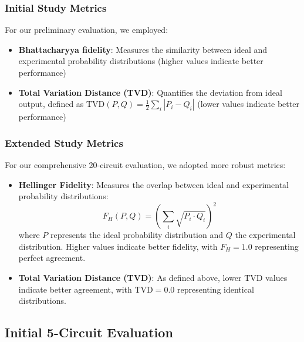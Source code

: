 \documentclass[conference]{IEEEtran}
\begin{document}
\subsubsection{Initial Study Metrics}
For our preliminary evaluation, we employed:
\begin{itemize}
    \item \textbf{Bhattacharyya fidelity}: Measures the similarity between ideal and experimental probability distributions (higher values indicate better performance)
    \item \textbf{Total Variation Distance (TVD)}: Quantifies the deviation from ideal output, defined as $\text{TVD}(P,Q) = \frac{1}{2} \sum_i |P_i - Q_i|$ (lower values indicate better performance)
\end{itemize}

\subsubsection{Extended Study Metrics}
For our comprehensive 20-circuit evaluation, we adopted more robust metrics:
\begin{itemize}
    \item \textbf{Hellinger Fidelity}: Measures the overlap between ideal and experimental probability distributions:
    \begin{equation}
    F_H(P,Q) = \left(\sum_i \sqrt{P_i \cdot Q_i}\right)^2
    \end{equation}
    where $P$ represents the ideal probability distribution and $Q$ the experimental distribution. Higher values indicate better fidelity, with $F_H = 1.0$ representing perfect agreement.
    
    \item \textbf{Total Variation Distance (TVD)}: As defined above, lower TVD values indicate better agreement, with $\text{TVD} = 0.0$ representing identical distributions.
\end{itemize}
\subsection{Initial 5-Circuit Evaluation}
\end{document}
